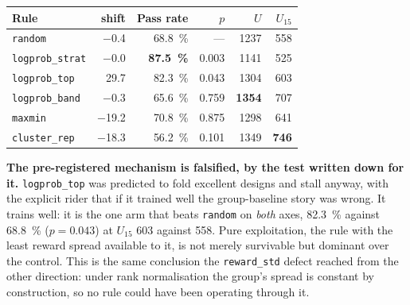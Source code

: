 \begin{center}
\begin{tabular}{@{}lrrrrr@{}}
\toprule
\textbf{Rule} & \textbf{shift} & \textbf{Pass rate} & $p$ &
$U$ & $U_{15}$ \\
\midrule
\texttt{random}         & \num{-0.4}  & \SI{68.8}{\percent} & ---   & 1237 & 558 \\
\texttt{logprob\_strat} & \num{-0.0}  & \textbf{\SI{87.5}{\percent}} & 0.003 & 1141 & 525 \\
\texttt{logprob\_top}   & \num{+29.7} & \SI{82.3}{\percent} & 0.043 & 1304 & 603 \\
\texttt{logprob\_band}  & \num{-0.3}  & \SI{65.6}{\percent} & 0.759 & \textbf{1354} & 707 \\
\texttt{maxmin}         & \num{-19.2} & \SI{70.8}{\percent} & 0.875 & 1298 & 641 \\
\texttt{cluster\_rep}   & \num{-18.3} & \SI{56.2}{\percent} & 0.101 & 1349 & \textbf{746} \\
\bottomrule
\end{tabular}
\end{center}


\textbf{The pre-registered mechanism is falsified, by the test written down for
it.} \texttt{logprob\_top} was predicted to fold excellent designs and stall
anyway, with the explicit rider that if it trained well the group-baseline story
was wrong. It trains well: it is the one arm that beats \texttt{random} on
\emph{both} axes, \SI{82.3}{\percent} against \SI{68.8}{\percent} ($p = 0.043$)
at $U_{15}$ 603 against 558. Pure exploitation, the rule with the least reward
spread available to it, is not merely survivable but dominant over the control.
This is the same conclusion the \texttt{reward\_std} defect reached from the
other direction: under rank normalisation the group's spread is constant by
construction, so no rule could have been operating through it.

